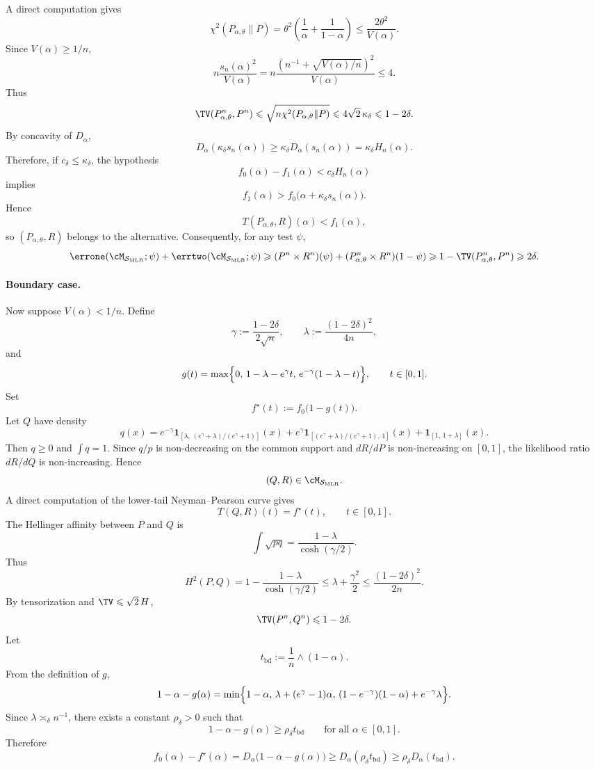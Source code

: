 \documentclass[english]{article}
\theoremstyle{plain}
\theoremstyle{definition}
\newcommand{\Toff}[2]{T(#1,#2)}
\newcommand{\errsum}[1]{\errone(\cM_{\smlr};#1)+\errtwo(\cM_{\smlr};#1)}
\newcommand{\fnull}{f_0}
\newcommand{\falt}{f_1}
\newcommand{\smlr}{\mathcal{S}_{\mathrm{MLR}}}     %
\newcommand{\fstar}{f^\star}                       %
\begin{document}
A direct computation gives
\[
\chi^2(P_{\alpha,\theta}\|P)
=
\theta^2
\left(
\frac1\alpha+\frac1{1-\alpha}
\right)
\leqslant
\frac{2\theta^2}{V(\alpha)}.
\]
Since \(V(\alpha)\geqslant1/n\),
\[
n\frac{s_n(\alpha)^2}{V(\alpha)}
=
n\frac{\left(n^{-1}+\sqrt{V(\alpha)/n}\right)^2}{V(\alpha)}
\leqslant 4.
\]
Thus
\[
\TV(P_{\alpha,\theta}^n,P^n)
\leqslant
\sqrt{n\chi^2(P_{\alpha,\theta}\|P)}
\leqslant
4\sqrt2\,\kappa_\delta
\leqslant
1-2\delta.
\]
By concavity of \(D_\alpha\),
\[
D_\alpha(\kappa_\delta s_n(\alpha))
\geqslant
\kappa_\delta D_\alpha(s_n(\alpha))
=
\kappa_\delta H_n(\alpha).
\]
Therefore, if \(c_\delta\leqslant\kappa_\delta\), the hypothesis
\[
\fnull(\alpha)-\falt(\alpha)<c_\delta H_n(\alpha)
\]
implies
\[
\falt(\alpha)
>
\fnull\bigl(\alpha+\kappa_\delta s_n(\alpha)\bigr).
\]
Hence
\[
\Toff{P_{\alpha,\theta}}{R}(\alpha)<\falt(\alpha),
\]
so \((P_{\alpha,\theta},R)\) belongs to the alternative.  Consequently, for
any test \(\psi\),
\[
\errsum{\psi}
\geqslant
(P^n\times R^n)(\psi)
+
(P_{\alpha,\theta}^n\times R^n)(1-\psi)
\geqslant
1-\TV(P_{\alpha,\theta}^n,P^n)
\geqslant
2\delta.
\]

\paragraph{Boundary case.}
Now suppose \(V(\alpha)<1/n\).  Define
\[
\gamma:=\frac{1-2\delta}{2\sqrt n},
\qquad
\lambda:=\frac{(1-2\delta)^2}{4n},
\]
and
\[
g(t)
=
\max\Bigl\{
0,\,
1-\lambda-e^\gamma t,\,
e^{-\gamma}(1-\lambda-t)
\Bigr\},
\qquad t\in[0,1].
\]
Set
\[
\fstar(t):=\fnull\bigl(1-g(t)\bigr).
\]
Let \(Q\) have density
\[
q(x)
=
e^{-\gamma}\mathbf 1_{[\lambda,\,(e^\gamma+\lambda)/(e^\gamma+1)]}(x)
+
e^\gamma\mathbf 1_{[(e^\gamma+\lambda)/(e^\gamma+1),\,1]}(x)
+
\mathbf 1_{[1,\,1+\lambda]}(x).
\]
Then \(q\geqslant0\) and \(\int q=1\).  Since \(q/p\) is non-decreasing on
the common support and \(dR/dP\) is non-increasing on \([0,1]\), the
likelihood ratio \(dR/dQ\) is non-increasing.  Hence
\[
(Q,R)\in\cM_{\smlr}.
\]
A direct computation of the lower-tail Neyman--Pearson curve gives
\[
\Toff{Q}{R}(t)=\fstar(t),
\qquad t\in[0,1].
\]
The Hellinger affinity between \(P\) and \(Q\) is
\[
\int\sqrt{pq}
=
\frac{1-\lambda}{\cosh(\gamma/2)}.
\]
Thus
\[
H^2(P,Q)
=
1-\frac{1-\lambda}{\cosh(\gamma/2)}
\leqslant
\lambda+\frac{\gamma^2}{2}
\leqslant
\frac{(1-2\delta)^2}{2n}.
\]
By tensorization and \(\TV\leqslant\sqrt2\,H\),
\[
\TV(P^n,Q^n)\leqslant 1-2\delta.
\]
Let
\[
t_{\mathrm{bd}}:=\frac1n\wedge(1-\alpha).
\]
From the definition of \(g\),
\[
1-\alpha-g(\alpha)
=
\min\Bigl\{
1-\alpha,\,
\lambda+(e^\gamma-1)\alpha,\,
(1-e^{-\gamma})(1-\alpha)+e^{-\gamma}\lambda
\Bigr\}.
\]
Since \(\lambda\asymp_\delta n^{-1}\), there exists a constant
\(\rho_\delta>0\) such that
\[
1-\alpha-g(\alpha)\geqslant \rho_\delta t_{\mathrm{bd}}
\qquad
\text{for all }\alpha\in[0,1].
\]
Therefore
\[
\fnull(\alpha)-\fstar(\alpha)
=
D_\alpha\bigl(1-\alpha-g(\alpha)\bigr)
\geqslant
D_\alpha(\rho_\delta t_{\mathrm{bd}})
\geqslant
\rho_\delta D_\alpha(t_{\mathrm{bd}}).
\]
\end{document}
